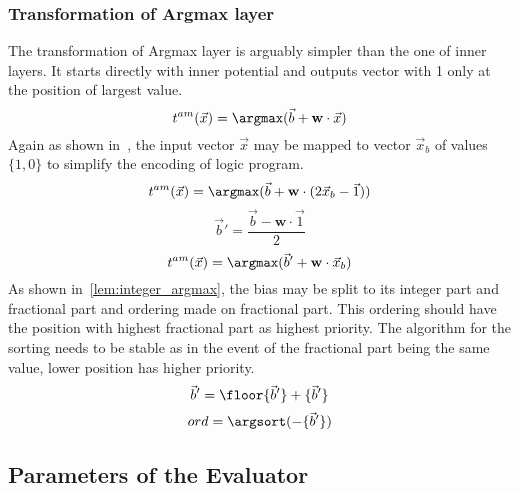 \subsubsection{Transformation of Argmax layer}

The transformation of Argmax layer is arguably simpler than the one of
inner layers. It starts directly with inner potential and outputs vector
with 1 only at the position of largest value.
\[t^{am}(\vec x) = \argmax(\vec b + \mathbf{w}\cdot \vec x)\]
Again as shown in~, the input vector $\vec x$
may be mapped to vector $\vec x_b$ of values $\{1,0\}$ to simplify the encoding
of logic program.
\[t^{am}(\vec x) = \argmax(\vec b + \mathbf{w}\cdot (2\vec x_b - \vec 1))\]
\[\vec b' = \frac{\vec b - \mathbf{w}\cdot \vec 1}{2}\]
\[t^{am}(\vec x) = \argmax(\vec b' + \mathbf{w}\cdot \vec x_b)\]
As shown in~\cref{lem:integer_argmax}, the bias may be split to its integer part
and fractional part and ordering made on fractional part. This ordering should have
the position with highest fractional part as highest priority. The algorithm for the
sorting needs to be stable as in the event of the fractional part being the same value,
lower position has higher priority.
\[\vec b' = \floor{\vec b'} + \{\vec b'\}\]
\[ord = \argsort(-\{\vec b'\})\]

\subsection{Parameters of the Evaluator}\label{sec:python_pars}

